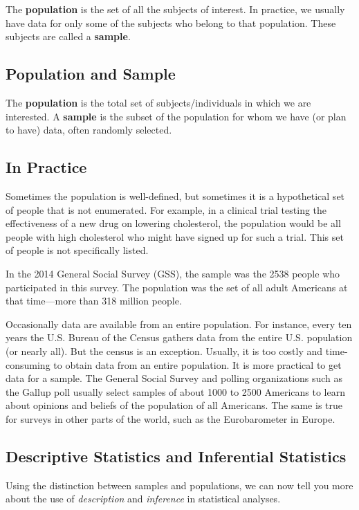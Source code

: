 The \textbf{population} is the set of all the subjects of interest. In practice, we usually have data for only some of the subjects who belong to that population. These subjects are called a \textbf{sample}.

\subsection{Population and Sample}
The \textbf{population} is the total set of subjects/individuals in which we are interested. A \textbf{sample} is the subset of the population for whom we have (or plan to have) data, often randomly selected.

\subsection*{In Practice}

Sometimes the population is well-defined, but sometimes it is a hypothetical set of people that is not enumerated. For example, in a clinical trial testing the effectiveness of a new drug on lowering cholesterol, the population would be all people with high cholesterol who might have signed up for such a trial. This set of people is not specifically listed.

In the 2014 General Social Survey (GSS), the sample was the 2538 people who participated in this survey. The population was the set of all adult Americans at that time—more than 318 million people. 

Occasionally data are available from an entire population. For instance, every ten years the U.S. Bureau of the Census gathers data from the entire U.S. population (or nearly all). But the census is an exception. Usually, it is too costly and time-consuming to obtain data from an entire population. It is more practical to get data for a sample. The General Social Survey and polling organizations such as the Gallup poll usually select samples of about 1000 to 2500 Americans to learn about opinions and beliefs of the population of all Americans. The same is true for surveys in other parts of the world, such as the Eurobarometer in Europe.

\subsection{Descriptive Statistics and Inferential Statistics}

Using the distinction between samples and populations, we can now tell you more about the use of \textit{description} and \textit{inference} in statistical analyses.

